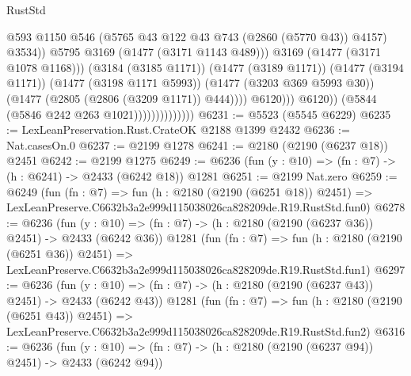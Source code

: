 \begin{lexlean}{RustStd}
\begin{coremodule}
                                                  @593
                                                  @1150
                                                  @546
                                                  (@5765
                                                    @43
                                                    @122
                                                    @43
                                                    @743
                                                    (@2860 (@5770 @43))
                                                    @4157)
                                                  @3534))
                                              @5795
                                              @3169
                                              (@1477 (@3171 @1143 @489)))
                                            @3169
                                            (@1477 (@3171 @1078 @1168)))
                                          (@3184 (@3185 @1171))
                                          (@1477 (@3189 @1171))
                                          (@1477 (@3194 @1171))
                                          (@1477 (@3198 @1171 @5993))
                                          (@1477 (@3203 @369 @5993 @30))
                                          (@1477 (@2805 (@2806 (@3209 @1171)) @444))))
                                      @6120)))
                                @6120))
                            (@5844 (@5846 @242 @263 @1021))))))))))))))
@6231 := @5523 (@5545 @6229)
@6235 := LexLeanPreservation.Rust.CrateOK @2188 @1399 @2432
@6236 := Nat.casesOn.{0}
@6237 := @2199 @1278
@6241 := @2180 (@2190 (@6237 @18)) @2451
@6242 := @2199 @1275
@6249 := @6236 (fun (y : @10) => (fn : @7) -> (h : @6241) -> @2433 (@6242 @18)) @1281
@6251 := @2199 Nat.zero
@6259 := @6249
    (fun (fn : @7) =>
    fun (h : @2180 (@2190 (@6251 @18)) @2451) =>
    LexLeanPreserve.C6632b3a2e999d115038026ca828209de.R19.RustStd.fun0)
@6278 := @6236
    (fun (y : @10) => (fn : @7) -> (h : @2180 (@2190 (@6237 @36)) @2451) -> @2433 (@6242 @36))
    @1281
    (fun (fn : @7) =>
    fun (h : @2180 (@2190 (@6251 @36)) @2451) =>
    LexLeanPreserve.C6632b3a2e999d115038026ca828209de.R19.RustStd.fun1)
@6297 := @6236
    (fun (y : @10) => (fn : @7) -> (h : @2180 (@2190 (@6237 @43)) @2451) -> @2433 (@6242 @43))
    @1281
    (fun (fn : @7) =>
    fun (h : @2180 (@2190 (@6251 @43)) @2451) =>
    LexLeanPreserve.C6632b3a2e999d115038026ca828209de.R19.RustStd.fun2)
@6316 := @6236
    (fun (y : @10) => (fn : @7) -> (h : @2180 (@2190 (@6237 @94)) @2451) -> @2433 (@6242 @94))

\end{coremodule}
\end{lexlean}
